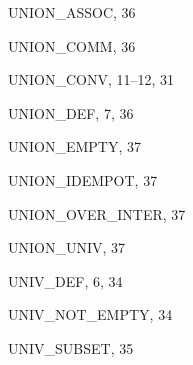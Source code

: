 \begin{theindex}
  \item {\ptt UNION\_ASSOC}, 36
  \item {\ptt UNION\_COMM}, 36
  \item {\ptt UNION\_CONV}, 11--12, 31
  \item {\ptt UNION\_DEF}, 7, 36
  \item {\ptt UNION\_EMPTY}, 37
  \item {\ptt UNION\_IDEMPOT}, 37
  \item {\ptt UNION\_OVER\_INTER}, 37
  \item {\ptt UNION\_UNIV}, 37
  \item {\ptt UNIV\_DEF}, 6, 34
  \item {\ptt UNIV\_NOT\_EMPTY}, 34
  \item {\ptt UNIV\_SUBSET}, 35

\end{theindex}
